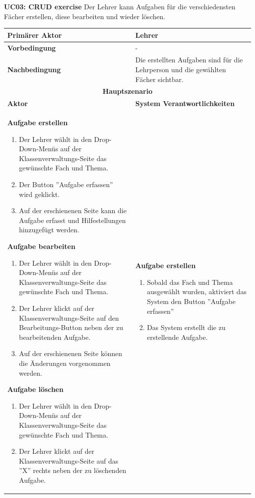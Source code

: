 \textbf{UC03: CRUD exercise} Der Lehrer kann Aufgaben für die verschiedensten Fächer erstellen, diese bearbeiten und wieder löschen.

\begin{tabularx}{\textwidth}{| X | X |}
	\hline
		\textbf{Primärer Aktor} & Lehrer \\
	\hline
		\textbf{Vorbedingung} & - \\
	\hline
		\textbf{Nachbedingung} & Die erstellten Aufgaben sind für die Lehrperson und die gewählten Fächer sichtbar. \\
	\hline
		\multicolumn{2}{|c|}{\textbf{Hauptszenario}} \\
	\hline
		\textbf{Aktor} & \textbf{System Verantwortlichkeiten} \\
	\hline
		\textbf{Aufgabe erstellen}
		\begin{enumerate}
			\item Der Lehrer wählt in den Drop-Down-Menüs auf der Klassenverwaltungs-Seite das gewünschte Fach und Thema.
			\item Der Button ''Aufgabe erfassen'' wird geklickt.
			\item Auf der erschienenen Seite kann die Aufgabe erfasst und Hilfestellungen hinzugefügt werden.
		\end{enumerate}
		
		\textbf{Aufgabe bearbeiten}
		\begin{enumerate}
			\item Der Lehrer wählt in den Drop-Down-Menüs auf der Klassenverwaltungs-Seite das gewünschte Fach und Thema.
			\item Der Lehrer klickt auf der Klassenverwaltungs-Seite auf den Bearbeitungs-Button neben der zu bearbeitenden Aufgabe.
			\item Auf der erschienenen Seite können die Änderungen vorgenommen werden. 
		\end{enumerate} 
		
		\textbf{Aufgabe löschen}
		\begin{enumerate}
			\item Der Lehrer wählt in den Drop-Down-Menüs auf der Klassenverwaltungs-Seite das gewünschte Fach und Thema.
			\item Der Lehrer klickt auf der Klassenverwaltungs-Seite auf das ''X'' rechts neben der zu löschenden Aufgabe.
		\end{enumerate} 
			& 
		\textbf{Aufgabe erstellen}
		\begin{enumerate}
			\item Sobald das Fach und Thema ausgewählt wurden, aktiviert das System den Button ''Aufgabe erfassen''
			\item Das System erstellt die zu erstellende Aufgabe.
		\end{enumerate} 
		

\end{tabularx}
